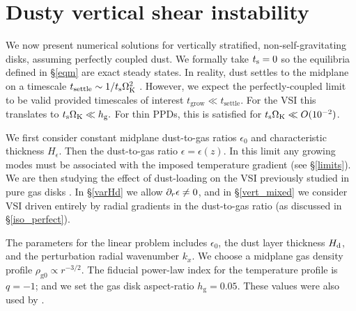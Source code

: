 \section{
  Dusty vertical shear instability}\label{results} 

We now present numerical solutions for vertically stratified,
non-self-gravitating disks, assuming perfectly coupled dust. 
We formally take $t_\mathrm{s}=0$ so the equilibria defined in \S\ref{eqm} 
are exact steady states. In reality,   
dust settles to the midplane on a timescale $t_\mathrm{settle}\sim 
1/t_\mathrm{s}\Omega_{\rm K}^2$ \citep{takeuchi02}. However, we expect the 
perfectly-coupled limit to be valid  
provided timescales of interest $t_\mathrm{grow}\ll
t_\mathrm{settle}$. For the VSI this translates to 
 $ t_\mathrm{s}\Omega_{\rm K} \ll h_\mathrm{g}. $
For thin PPDs, this is satisfied for $t_\mathrm{s}\Omega_{\rm K} \ll O(10^{-2})$.   


We first consider constant
midplane dust-to-gas ratios $\epsilon_0$ and characteristic thickness
$H_\epsilon$. Then the dust-to-gas ratio $\epsilon=\epsilon(z)$. In 
this limit any growing modes must be associated with the imposed
temperature gradient (see \S\ref{limits}). We are then studying the
effect of dust-loading on the VSI previously studied in pure gas
disks \citep[][ in this section]{lin15}. In 
\S\ref{varHd} we allow $\partial_r\epsilon\neq 0$, and in 
\S\ref{vert_mixed} we consider VSI driven entirely by radial
gradients in the dust-to-gas ratio (as discussed in
\S\ref{iso_perfect}).  

The parameters for the linear problem includes $\epsilon_0$, the dust
layer thickness $H_\mathrm{d}$, and the perturbation radial wavenumber
$k_x$. We choose a midplane gas density profile 
$\rho_\mathrm{g0}\propto r^{-3/2}$. The fiducial power-law 
index for the temperature profile is $q=-1$; and we set the gas disk
aspect-ratio $h_\mathrm{g}=0.05$. These values were also used by  
. 

